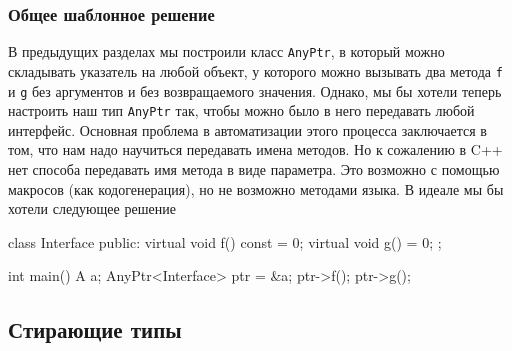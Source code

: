 \subsubsection{Общее шаблонное решение}

В предыдущих разделах мы построили класс \texttt{AnyPtr}, в который можно складывать указатель на любой объект, у которого можно вызывать два метода \texttt{f} и \texttt{g} без аргументов и без возвращаемого значения.
Однако, мы бы хотели теперь настроить наш тип \texttt{AnyPtr} так, чтобы можно было в него передавать любой интерфейс.
Основная проблема в автоматизации этого процесса заключается в том, что нам надо научиться передавать имена методов.
Но к сожалению в C++ нет способа передавать имя метода в виде параметра.
Это возможно с помощью макросов (как кодогенерация), но не возможно методами языка.
В идеале мы бы хотели следующее решение
\begin{cppcode}
class Interface {
public:
  virtual void f() const = 0;
  virtual void g() = 0;
};

int main() {
  A a;
  AnyPtr<Interface> ptr = &a;
  ptr->f();
  ptr->g();
}
\end{cppcode}

\subsection{Стирающие типы}
\label{section::TypeErasure}

